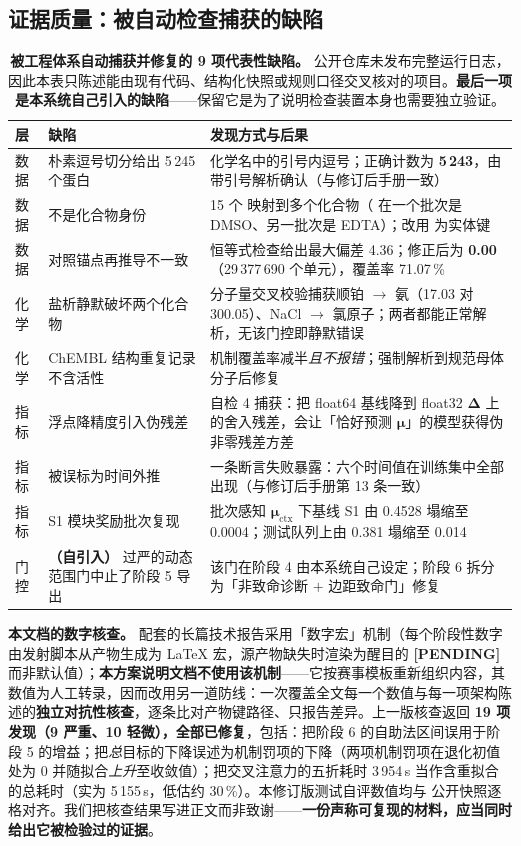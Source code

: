 \subsection{证据质量：被自动检查捕获的缺陷}

\begin{table}[H]
\centering\small
\caption{\textbf{被工程体系自动捕获并修复的 9 项代表性缺陷。} 公开仓库未发布完整运行日志，因此本表只陈述能由现有代码、结构化快照或规则口径交叉核对的项目。\textbf{最后一项是本系统自己引入的缺陷}——保留它是为了说明检查装置本身也需要独立验证。}
\label{tab:defects}
\begin{tabularx}{\textwidth}{@{}p{0.9cm}R{4.9cm}X@{}}
\toprule
层 & 缺陷 & 发现方式与后果 \\
\midrule
数据 & 朴素逗号切分给出 5\,245 个蛋白 & 化学名中的引号内逗号；正确计数为 \textbf{5\,243}，由带引号解析确认（与修订后手册一致） \\
数据 &  不是化合物身份 & 15 个  映射到多个化合物（ 在一个批次是 DMSO、另一批次是 EDTA）；改用  为实体键 \\
数据 & 对照锚点再推导不一致 & 恒等式检查给出最大偏差 4.36；修正后为 \textbf{0.00}（29\,377\,690 个单元），覆盖率 71.07\,\% \\
化学 & 盐析静默破坏两个化合物 & 分子量交叉校验捕获顺铂 $\to$ 氨（17.03 对 300.05）、NaCl $\to$ 氯原子；两者都能正常解析，无该门控即静默错误 \\
化学 & ChEMBL 结构重复记录不含活性 & 机制覆盖率减半\emph{且不报错}；强制解析到规范母体分子后修复 \\
指标 & 浮点降精度引入伪残差 & 自检 4 捕获：把 float64 基线降到 float32 $\bm{\Delta}$ 上的舍入残差，会让「恰好预测 $\bm{\mu}$」的模型获得伪非零残差方差 \\
指标 &  被误标为时间外推 & 一条断言失败暴露：六个时间值在训练集中全部出现（与修订后手册第 13 条一致） \\
指标 & S1 模块奖励批次复现 & 批次感知 $\bm{\mu}_{\text{ctx}}$ 下基线 S1 由 0.4528 塌缩至 0.0004；\NEW{}测试队列上由 0.381 塌缩至 0.014 \\
门控 & \textbf{（自引入）} 过严的动态范围门中止了阶段 5 导出 & 该门在阶段 4 由本系统自己设定；阶段 6 拆分为「非致命诊断 $+$ 边距致命门」修复 \\
\bottomrule
\end{tabularx}
\end{table}

\textbf{本文档的数字核查。} 配套的长篇技术报告采用「数字宏」机制（每个阶段性数字由发射脚本从产物生成为 LaTeX 宏，源产物缺失时渲染为醒目的 \textbf{[PENDING]} 而非默认值）；\textbf{本方案说明文档不使用该机制}——它按赛事模板重新组织内容，其数值为人工转录，因而改用另一道防线：一次覆盖全文每一个数值与每一项架构陈述的\textbf{独立对抗性核查}，逐条比对产物键路径、只报告差异。上一版核查返回 \textbf{19 项发现（9 严重、10 轻微），全部已修复}，包括：把阶段 6 的自助法区间误用于阶段 5 的增益；把\emph{总}目标的下降误述为机制罚项的下降（两项机制罚项在退化初值处为 0 并随拟合\emph{上升}至收敛值）；把交叉注意力的五折耗时 3\,954\,s 当作含重拟合的总耗时（实为 5\,155\,s，低估约 30\,\%）。本修订版测试自评数值均与  公开快照逐格对齐。我们把核查结果写进正文而非致谢——\textbf{一份声称可复现的材料，应当同时给出它被检验过的证据}。

